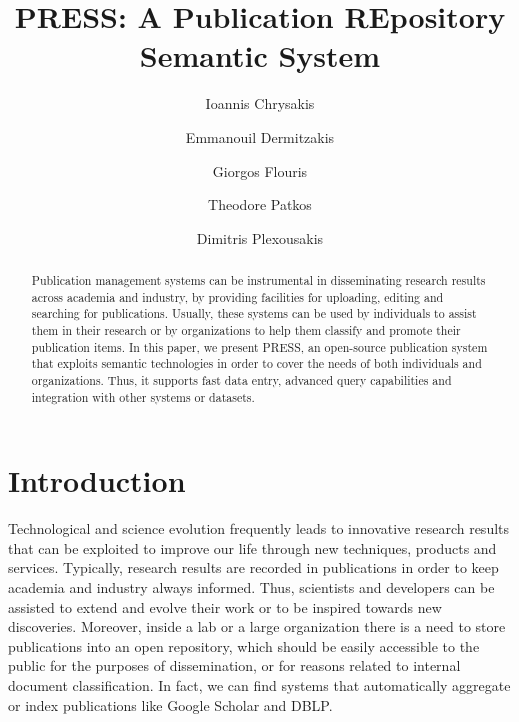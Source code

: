 \documentclass[runningheads,a4paper]{llncs}
\begin{document}
\mainmatter

\title{PRESS: A Publication REpository Semantic System}
\author{Ioannis Chrysakis \and
Emmanouil Dermitzakis \and
Giorgos Flouris \and
Theodore Patkos \and
Dimitris Plexousakis}
\maketitle

\begin{abstract}
Publication management systems can be instrumental in disseminating research results across academia and industry, by providing facilities for uploading, editing and searching for publications. Usually, these systems can be used by individuals to assist them in their research or by organizations to help them classify and promote their publication items. In this paper, we present PRESS, an open-source publication system that exploits semantic technologies in order to cover the needs of both individuals and organizations. Thus, it supports fast data entry, advanced query capabilities and integration with other systems or datasets.

\end{abstract}


\section{Introduction}

Technological and science evolution frequently leads to innovative research results that can be exploited to improve our life through new techniques, products and services. Typically, research results are recorded in publications in order to keep academia and industry always informed. Thus, scientists and developers can be assisted to extend and evolve their work or to be inspired towards new discoveries. Moreover, inside a lab or a large organization there is a need to store publications into an open repository, which should be easily accessible to the public for the purposes of dissemination, or for reasons related to internal document classification. In fact, we can find systems that automatically aggregate or index publications like Google Scholar and DBLP. 
\end{document}
